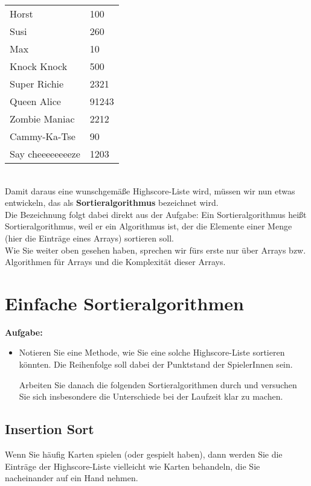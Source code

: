 \begin{tabular}{l l}
	Horst & 100 \\
	Susi & 260 \\
	Max & 10 \\
	Knock Knock & 500 \\
	Super Richie & 2321\\
	Queen Alice & 91243 \\
	Zombie Maniac & 2212 \\
	Cammy-Ka-Tse & 90 \\
	Say cheeeeeeeeze & 1203 \\
\end{tabular}\\

Damit daraus eine wunschgemäße Highscore-Liste wird, müssen wir nun etwas entwickeln, das als \textbf{Sortieralgorithmus} bezeichnet wird.\\

Die Bezeichnung folgt dabei direkt aus der Aufgabe: Ein Sortieralgorithmus heißt Sortieralgorithmus, weil er ein Algorithmus ist, der die Elemente einer Menge (hier die Einträge eines Arrays) sortieren soll.\\

Wie Sie weiter oben gesehen haben, sprechen wir fürs erste nur über Arrays bzw. Algorithmen für Arrays und die Komplexität dieser Arrays.

\chapter{Einfache Sortieralgorithmen}

\textbf{Aufgabe:}

\begin{itemize}
	\item Notieren Sie eine Methode, wie Sie eine solche Highscore-Liste sortieren könnten. Die Reihenfolge soll dabei der Punktstand der SpielerInnen sein.
	
	Arbeiten Sie danach die folgenden Sortieralgorithmen durch und versuchen Sie sich insbesondere die Unterschiede bei der Laufzeit klar zu machen.
\end{itemize}

\section{Insertion Sort}

Wenn Sie häufig Karten spielen (oder gespielt haben), dann werden Sie die Einträge der Highscore-Liste vielleicht wie Karten behandeln, die Sie nacheinander auf ein Hand nehmen.\\

